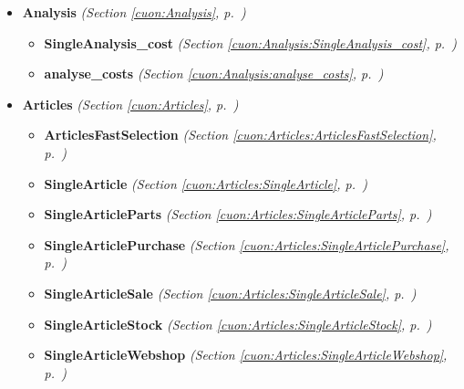 \begin{itemize}
\begin{itemize}
  \end{itemize}
\item \textbf{Analysis}
  \textit{(Section \ref{cuon:Analysis}, p.~\pageref{cuon:Analysis})}

  \begin{itemize}
\setlength{\parskip}{0ex}
    \item \textbf{SingleAnalysis\_cost}
  \textit{(Section \ref{cuon:Analysis:SingleAnalysis_cost}, p.~\pageref{cuon:Analysis:SingleAnalysis_cost})}

    \item \textbf{analyse\_costs}
  \textit{(Section \ref{cuon:Analysis:analyse_costs}, p.~\pageref{cuon:Analysis:analyse_costs})}

  \end{itemize}
\item \textbf{Articles}
  \textit{(Section \ref{cuon:Articles}, p.~\pageref{cuon:Articles})}

  \begin{itemize}
\setlength{\parskip}{0ex}
    \item \textbf{ArticlesFastSelection}
  \textit{(Section \ref{cuon:Articles:ArticlesFastSelection}, p.~\pageref{cuon:Articles:ArticlesFastSelection})}

    \item \textbf{SingleArticle}
  \textit{(Section \ref{cuon:Articles:SingleArticle}, p.~\pageref{cuon:Articles:SingleArticle})}

    \item \textbf{SingleArticleParts}
  \textit{(Section \ref{cuon:Articles:SingleArticleParts}, p.~\pageref{cuon:Articles:SingleArticleParts})}

    \item \textbf{SingleArticlePurchase}
  \textit{(Section \ref{cuon:Articles:SingleArticlePurchase}, p.~\pageref{cuon:Articles:SingleArticlePurchase})}

    \item \textbf{SingleArticleSale}
  \textit{(Section \ref{cuon:Articles:SingleArticleSale}, p.~\pageref{cuon:Articles:SingleArticleSale})}

    \item \textbf{SingleArticleStock}
  \textit{(Section \ref{cuon:Articles:SingleArticleStock}, p.~\pageref{cuon:Articles:SingleArticleStock})}

    \item \textbf{SingleArticleWebshop}
  \textit{(Section \ref{cuon:Articles:SingleArticleWebshop}, p.~\pageref{cuon:Articles:SingleArticleWebshop})}


\end{itemize}
\end{itemize}
